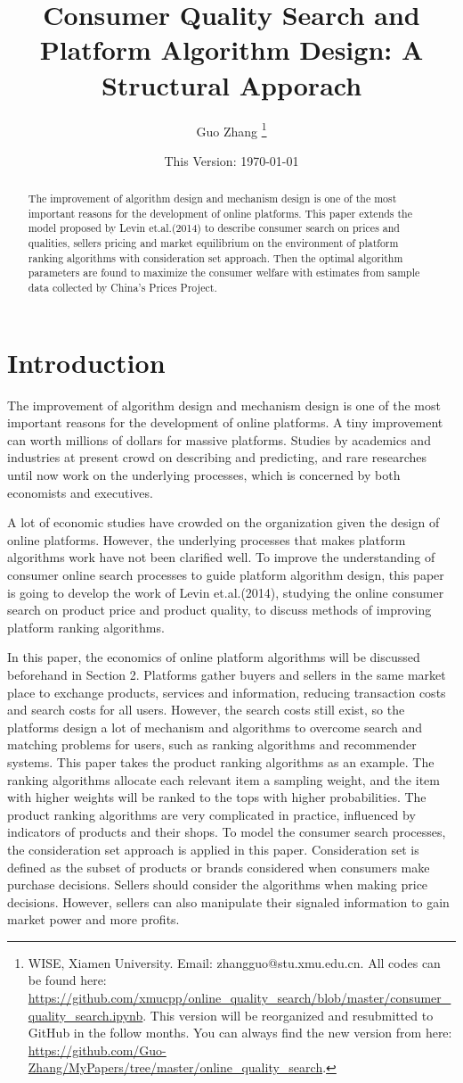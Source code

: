 \documentclass{article}
\title{Consumer Quality Search and Platform Algorithm Design: A Structural Apporach}
\author{
Guo Zhang
\thanks{WISE, Xiamen University. Email: zhangguo@stu.xmu.edu.cn. 
All codes can be found here: \url{https://github.com/xmucpp/online_quality_search/blob/master/consumer_quality_search.ipynb}. 
This version will be reorganized and resubmitted to GitHub in the follow months. 
You can always find the new version from here: \url{https://github.com/Guo-Zhang/MyPapers/tree/master/online_quality_search}.}
}
\date{This Version: \today}
\begin{document}
\maketitle

\begin{abstract}
The improvement of algorithm design and mechanism design is one of the
most important reasons for the development of online platforms. 
This paper extends the model proposed by Levin et.al.(2014) to describe
consumer search on prices and qualities, sellers pricing and market equilibrium on the environment of platform ranking algorithms with consideration set approach. Then the optimal algorithm parameters are found to maximize the consumer welfare with estimates from sample data collected by China's Prices Project. 
\end{abstract}

\section{Introduction}

The improvement of algorithm design and mechanism design is one of the
most important reasons for the development of online platforms. A tiny
improvement can worth millions of dollars for massive platforms. Studies
by academics and industries at present crowd on describing and
predicting, and rare researches until now work on the underlying
processes, which is concerned by both economists and executives.

A lot of economic studies have crowded on the organization given the design of online platforms. However, the underlying processes that makes platform algorithms work have not been clarified well. To improve the understanding of consumer online search processes to guide platform algorithm design, this paper is going to develop the work of Levin et.al.(2014), studying the online consumer search on product price and product quality, to discuss methods of improving platform ranking algorithms. 

In this paper, the economics of online platform algorithms will be discussed beforehand in Section 2. Platforms gather buyers and sellers in the same market place to exchange products, services and information, reducing transaction costs and search costs for all users. However, the search costs still exist, so the platforms design a lot of mechanism and algorithms to overcome search and matching problems for users, such as ranking algorithms and recommender systems. This paper takes the product ranking algorithms as an example. The ranking algorithms allocate each relevant item a sampling weight, and the item with higher weights will be ranked to the tops with higher probabilities. The product ranking algorithms are very complicated in practice, influenced by indicators of products and their shops. To model the consumer search processes, the consideration set approach is applied in this paper. Consideration set is defined as the subset of products or brands considered when consumers make purchase decisions.  Sellers should consider the algorithms when making price decisions. However, sellers can also manipulate their signaled information to gain market power and more profits. 
\end{document}
